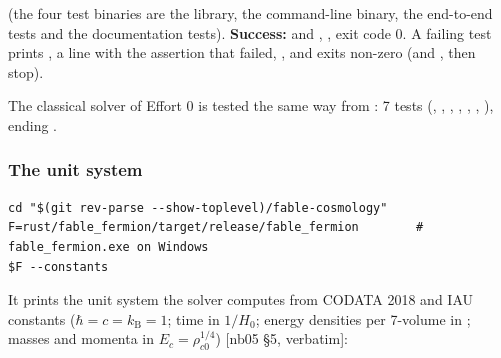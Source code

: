 (the four test binaries are the library, the command-line binary, the end-to-end tests and the documentation tests). \textbf{Success:}  and , , exit code 0. A failing test prints , a  line with the assertion that failed, , and exits non-zero (and ,  then stop).

The classical solver of Effort 0 is tested the same way from : 7 tests (, , , , , , ), ending .

\subsubsection{The unit system}
\label{sec:6.4.3}

\begin{Verbatim}
cd "$(git rev-parse --show-toplevel)/fable-cosmology"
F=rust/fable_fermion/target/release/fable_fermion        # fable_fermion.exe on Windows
$F --constants
\end{Verbatim}

It prints the unit system the solver computes from CODATA 2018 and IAU constants ($\hbar = c = k_{\mathrm{B}} = 1$; time in $1/H_0$; energy densities per 7-volume in ; masses and momenta in $E_c = \rho_{c0}^{1/4}$) [nb05 \S{}5, verbatim]:

